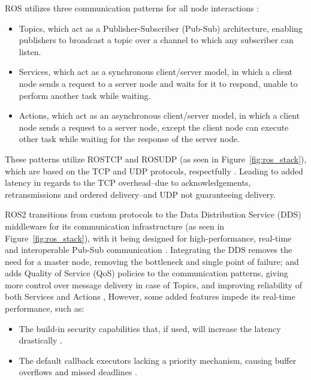 \documentclass[conference,a4paper]{IEEEtran}
\begin{document}
\setlength{\parskip}{1em}
\setlength{\parindent}{10pt}
ROS utilizes three communication patterns for all node interactions \cite{Maruyama2016, Chaves2022}:
\setlength{\parskip}{0em}
\setlength{\parindent}{0pt}
\begin{itemize}
	\item Topics, which act as a \mbox{Publisher-Subscriber} (\mbox{Pub-Sub}) architecture, enabling publishers to broadcast a topic over a channel to which any subscriber can listen.
	\item Services, which act as a synchronous client/server model, in which a client node sends a request to a server node and waits for it to respond, unable to perform another task while waiting.
	\item Actions, which act as an asynchronous client/server model, in which a client node sends a request to a server node, except the client node can execute other task while waiting for the response of the server node.
\end{itemize}
\setlength{\parskip}{0em}
\setlength{\parindent}{0pt}
These patterns utilize ROSTCP and ROSUDP (as seen in Figure~\ref{fig:ros_stack}), which are based on the TCP and UDP protocols, respectfully \cite{Macenski2022}.
Leading to added latency in regards to the TCP overhead--due to acknowledgements, retransmissions and ordered delivery--and UDP not guaranteeing delivery.

\setlength{\parskip}{1em}
\setlength{\parindent}{10pt}
ROS2 transitions from custom protocols to the Data Distribution Service (DDS) middleware for its communication infrastructure (as seen in Figure~\ref{fig:ros_stack}), with it being designed for \mbox{high-performance}, \mbox{real-time} and interoperable \mbox{Pub-Sub} communication \cite{Macenski2022}.
Integrating the DDS removes the need for a master node, removing the bottleneck and single point of failure; 
and adds Quality of Service (QoS) policies to the communication patterns, giving more control over message delivery in case of Topics, and improving reliability of both Services and Actions \cite{Macenski2022},
However, some added features impede its \mbox{real-time} performance, such as:
\setlength{\parskip}{0em}
\setlength{\parindent}{0pt}
\begin{itemize}
	\item The \mbox{build-in} security capabilities that, if used, will increase the latency drastically \cite{Kim2018}.
	\item The default callback executors lacking a priority mechanism, causing buffer overflows and missed deadlines \cite{Casini2019}.
\end{itemize}
\end{document}
